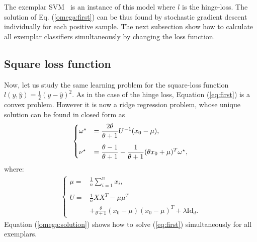 The exemplar SVM~\cite{Efros11,Efros12} is an instance of this model where $l$ is the hinge-loss. 
The solution of Eq. (\ref{omega:first}) can be thus found by stochastic gradient descent~\cite{bottou10} individually for each positive sample. The next subsection show how to calculate all exemplar classifiers simultaneously by changing the loss function.

\subsection{Square loss function}\label{slem:intro}
Now, let us study the same learning problem for the square-loss function $l(y,\hat{y}) = \frac{1}{2}(y-\hat{y})^2$. As in the case of the hinge loss, Equation (\ref{eq:first}) is a convex problem. 
However it is now a ridge regression problem, whose unique solution can be found in closed form as
\begin{align}
\begin{cases}
\vspace{3 mm}
\omega^\star &= \dfrac{2\theta}{\theta+1}U^{-1}(x_0-\mu), \\
\nu^\star &= \dfrac{\theta-1}{\theta+1}-\dfrac{1}{\theta+1}(\theta x_0+\mu)^T\omega^\star,
\end{cases}
\label{omega:solution}
\end{align}
where:
\begin{align}
\begin{cases}
\mu = &\frac{1}{n}\sum_{i=1}^n x_i,\\ \\
U = &\frac{1}{n}XX^T-\mu\mu^T\\
&+\frac{\theta}{\theta+1}(x_0-\mu)(x_0-\mu)^T+\lambda\mathrm{Id}_d. \label{eq:U}
\end{cases}
\end{align}
Equation (\ref{omega:solution}) shows how to solve (\ref{eq:first}) simultaneously for all exemplars.
\cite{lssvm}

